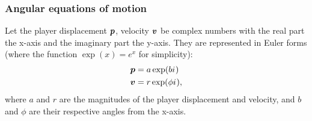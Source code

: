 
\subsubsection{Angular equations of motion}
Let the player displacement $\boldsymbol{p}$, velocity $\boldsymbol{v}$ be complex numbers with the real part the x-axis and the imaginary part the y-axis. They are represented in Euler forms (where the function $\exp(x)= e^{x}$ for simplicity):
\begin{align*}
    \boldsymbol{p} &= a \exp(b {i\mkern1mu})\\
    \boldsymbol{v} &= r \exp(\phi {i\mkern1mu}),
\end{align*}
where $a$ and $r$ are the magnitudes of the player displacement and velocity, and $b$ and $\phi$ are their respective angles from the x-axis.

